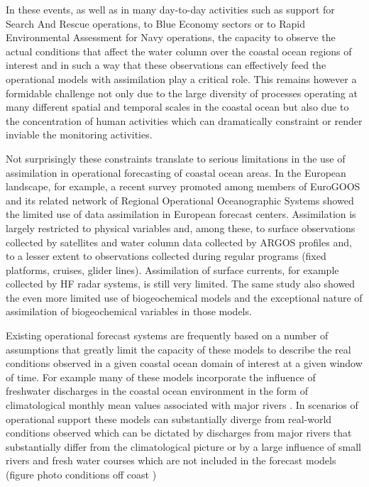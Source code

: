 In these events, as well as in many day-to-day activities such as
support for Search And Rescue operations, to Blue Economy sectors or
to Rapid Environmental Assessment for Navy operations, the capacity to
observe the actual conditions that affect the water column over the
coastal ocean regions of interest and in such a way that these
observations can effectively feed the operational models with
assimilation play a critical role. This remains however a formidable
challenge not only due to the large diversity of processes operating
at many different spatial and temporal scales in the coastal ocean but
also due to the concentration of human activities which can
dramatically constraint or render inviable the monitoring activities.

Not surprisingly these constraints translate to serious limitations in
the use of assimilation in operational forecasting of coastal ocean
areas. In the European landscape, for example, a recent survey
promoted among members of EuroGOOS and its related network of Regional
Operational Oceanographic Systems \cite{capet2020} showed the limited
use of data assimilation in European forecast centers. Assimilation
is largely restricted to physical variables and, among these, to
surface observations collected by satellites and water column data
collected by ARGOS profiles and, to a lesser extent to observations
collected during regular programs (fixed platforms, cruises, glider
lines). Assimilation of surface currents, for example collected by HF
radar systems, is still very limited. The same study also showed the
even more limited use of biogeochemical models and the exceptional
nature of assimilation of biogeochemical variables in those models.
 
Existing operational forecast systems are frequently based on a number
of assumptions that greatly limit the capacity of these models to
describe the real conditions observed in a given coastal ocean domain
of interest at a given window of time. For example many of these
models incorporate the influence of freshwater discharges in the
coastal ocean environment in the form of climatological monthly mean
values associated with major rivers
\cite{marta012}. %
In scenarios of operational support these models can substantially
diverge from real-world conditions observed which can be dictated by
discharges from major rivers that substantially differ from the
climatological picture or by a large influence of small rivers and
fresh water courses which are not included in the forecast models
(figure photo conditions off coast \naze)
 
